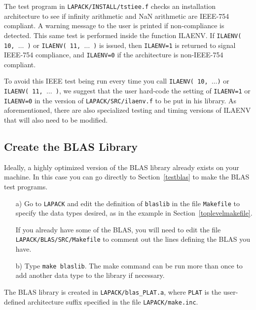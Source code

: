 \documentclass[11pt]{report}
\begin{document}

The test program in \texttt{LAPACK/INSTALL/tstiee.f} checks an installation
architecture
to see if infinity arithmetic and NaN arithmetic are IEEE-754 compliant.  
A warning message to the user is printed if non-compliance is detected.
This same test is performed inside the function ILAENV.  If
\texttt{ILAENV( 10, $\ldots$ )} or \texttt{ILAENV( 11, $\ldots$ )} is 
issued, then \texttt{ILAENV=1} is returned to signal IEEE-754 compliance,
and \texttt{ILAENV=0} if the architecture is non-IEEE-754 compliant.

To avoid this IEEE test being run every time you call
\texttt{ILAENV( 10, $\ldots$)} or \texttt{ILAENV( 11, $\ldots$ )}, we suggest
that the user hard-code the setting of
\texttt{ILAENV=1} or \texttt{ILAENV=0} in the version of \texttt{LAPACK/SRC/ilaenv.f} to be put in
his library.  As aforementioned, there are also specialized testing and
timing versions of ILAENV that will also need to be modified.

\subsection{Create the BLAS Library} 

Ideally, a highly optimized version of the BLAS library already
exists on your machine. 
In this case you can go directly to Section~\ref{testblas} to
make the BLAS test programs.  

\begin{itemize}
\item[a)]
Go to \texttt{LAPACK} and edit the definition of \texttt{blaslib} in the
file \texttt{Makefile} to specify the data types desired, as in the example
in Section~\ref{toplevelmakefile}.

If you already have some of the BLAS, you will need to edit the file
\texttt{LAPACK/BLAS/SRC/Makefile} to comment out the lines 
defining the BLAS you have.  

\item[b)]
Type \texttt{make blaslib}.
The make command can be run more than once to add another
data type to the library if necessary.  
\end{itemize}

\noindent
The BLAS library is created in \texttt{LAPACK/blas\_PLAT.a}, where
\texttt{PLAT} is the user-defined architecture suffix specified in the file
\texttt{LAPACK/make.inc}.
\end{document}
